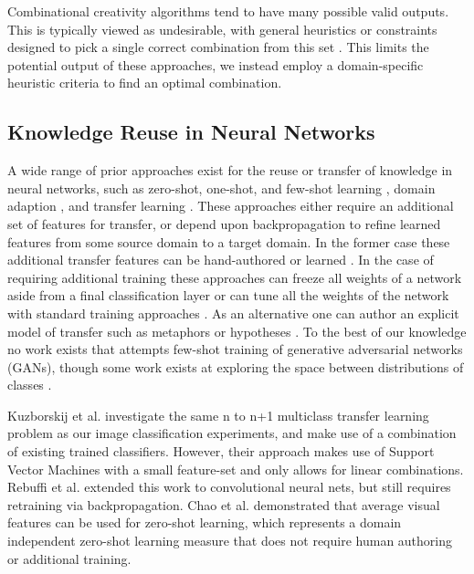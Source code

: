 \documentclass[letterpaper]{article}
\begin{document}
Combinational creativity algorithms tend to have many possible valid outputs. This is typically viewed as undesirable, with general heuristics or constraints designed to pick a single correct combination from this set \cite{fauconnier2001conceptual,ontanon2010amalgams}. This limits the potential output of these approaches, we instead employ a domain-specific heuristic criteria to find an optimal combination.

\subsection{Knowledge Reuse in Neural Networks}

A wide range of prior approaches exist for the reuse or transfer of knowledge in neural networks, such as zero-shot, one-shot, and few-shot learning \cite{xian2017zero,fei2006one}, domain adaption \cite{daume2009frustratingly}, and transfer learning \cite{lampert2009learning,wang2016learning}. 
These approaches either require an additional set of features for transfer, or depend upon backpropagation to refine learned features from some source domain to a target domain. In the former case these additional transfer features can be hand-authored \cite{lampert2009learning,kulis2011you,ganin2016domain} or learned \cite{levy2012teaching,norouzi2013zero,mensink2014costa,ba2015predicting,elhoseiny2017link}. 
In the case of requiring additional training these approaches can freeze all weights of a network aside from a final classification layer or can tune all the weights of the network with standard training approaches \cite{wong2016sequence,li2017large}. As an alternative one can author an explicit model of transfer such as metaphors \cite{levy2012teaching} or hypotheses \cite{kuzborskij2013stability}. To the best of our knowledge no work exists that attempts few-shot training of generative adversarial networks (GANs), though some work exists at exploring the space between distributions of classes \cite{cheongcan}.

Kuzborskij et al.  investigate the same n to n+1 multiclass transfer learning problem as our image classification experiments, and make use of a combination of existing trained classifiers. However, their approach makes use of Support Vector Machines with a small feature-set and only allows for linear combinations. Rebuffi et al.  extended this work to convolutional neural nets, but still requires retraining via backpropagation. Chao et al.  demonstrated that average visual features can be used for zero-shot learning, which represents a domain independent zero-shot learning measure that does not require human authoring or additional training.
\end{document}
